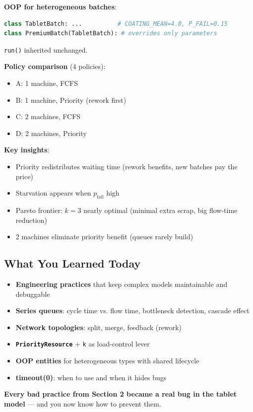 \documentclass[11pt]{article}
\begin{document}
\textbf{OOP for heterogeneous batches}:
\begin{lstlisting}[language=Python]
class TabletBatch: ...          # COATING_MEAN=4.0, P_FAIL=0.15
class PremiumBatch(TabletBatch): # overrides only parameters
\end{lstlisting}
\texttt{run()} inherited unchanged.

\textbf{Policy comparison} (4 policies):
\begin{itemize}[leftmargin=*]
\item A: 1 machine, FCFS
\item B: 1 machine, Priority (rework first)
\item C: 2 machines, FCFS
\item D: 2 machines, Priority
\end{itemize}

\textbf{Key insights}:
\begin{itemize}[leftmargin=*]
\item Priority redistributes waiting time (rework benefits, new batches pay the price)
\item Starvation appears when \(p_{\text{fail}}\) high
\item Pareto frontier: \(k=3\) nearly optimal (minimal extra scrap, big flow-time reduction)
\item 2 machines eliminate priority benefit (queues rarely build)
\end{itemize}

\subsection*{What You Learned Today}
\begin{itemize}[leftmargin=*]
\item \textbf{Engineering practices} that keep complex models maintainable and debuggable
\item \textbf{Series queues}: cycle time vs. flow time, bottleneck detection, cascade effect
\item \textbf{Network topologies}: split, merge, feedback (rework)
\item \textbf{\texttt{PriorityResource}} + \texttt{k} as load-control lever
\item \textbf{OOP entities} for heterogeneous types with shared lifecycle
\item \textbf{timeout(0)}: when to use and when it hides bugs
\end{itemize}

\textbf{Every bad practice from Section 2 became a real bug in the tablet model} --- and you now know how to prevent them.
\end{document}
